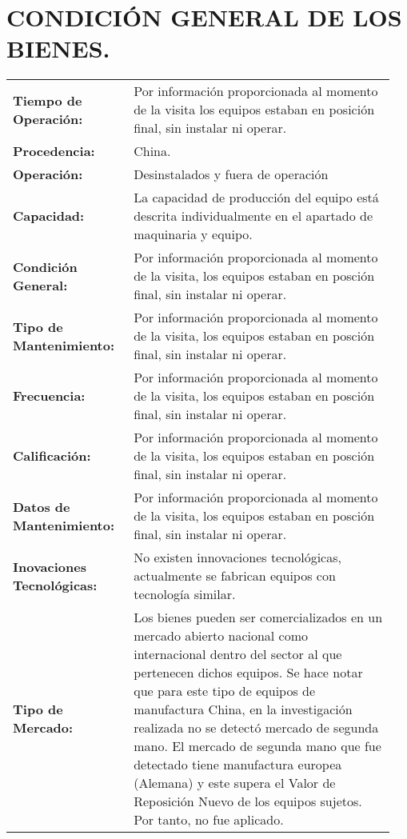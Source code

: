 \section{CONDICIÓN GENERAL DE LOS BIENES.} %
\begin{tabular}{p{0.3 \linewidth} p{0.65 \linewidth}}
	\bf Tiempo de Operación:      & Por información proporcionada al momento de la visita los equipos estaban en posición final, sin instalar ni operar. \\
	\bf Procedencia:              & China.  \\
	\bf Operación:                & Desinstalados y fuera de operación \\  
	\bf Capacidad:                & La capacidad de producción del equipo está descrita individualmente en el apartado de maquinaria y equipo. \\
	\bf Condición General:        & Por información proporcionada al momento de la visita, los equipos estaban en posción final, sin instalar ni operar. \\
	\bf Tipo de Mantenimiento:    & Por información proporcionada al momento de la visita, los equipos estaban en posción final, sin instalar ni operar. \\
	\bf Frecuencia:               & Por información proporcionada al momento de la visita, los equipos estaban en posción final, sin instalar ni operar. \\
	\bf Calificación:             & Por información proporcionada al momento de la visita, los equipos estaban en posción final, sin instalar ni operar. \\
	\bf Datos de Mantenimiento:   & Por información proporcionada al momento de la visita, los equipos estaban en posción final, sin instalar ni operar. \\
	\bf Inovaciones Tecnológicas: & No existen innovaciones tecnológicas, actualmente se fabrican equipos con tecnología similar. \\
	\bf Tipo de Mercado:          & Los bienes pueden ser comercializados en un mercado abierto nacional como internacional dentro del sector al que pertenecen dichos equipos. 
	Se hace notar que para este tipo de equipos de manufactura China, en la investigación realizada no se detectó mercado de segunda mano. 
	El mercado de segunda mano que fue detectado tiene manufactura europea (Alemana) y este supera el Valor de Reposición Nuevo de los equipos sujetos. 
	Por tanto, no fue aplicado.
\end{tabular}

